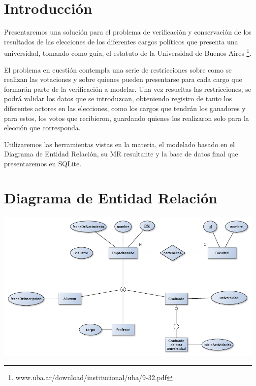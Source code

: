 \documentclass[a4paper, 10pt, twoside]{article}
\begin{document}
\newpage




\section{Introducción}

Presentaremos una solución para el problema de verificación y conservación de los resultados de las elecciones de los diferentes cargos políticos que presenta una universidad, tomando como guía, el estatuto de la Universidad de Buenos Aires \footnote{www.uba.ar/download/institucional/uba/9-32.pdf}.

El problema en cuestión contempla una serie de restricciones sobre como se realizan las votaciones y sobre quienes pueden presentarse para cada cargo que formarán parte de la verificación a modelar. Una vez resueltas las restricciones, se podrá validar los datos que se introduzcan, obteniendo registro de tanto los diferentes actores en las elecciones, como los cargos que tendrán los ganadores y para estos, los votos que recibieron, guardando quienes los realizaron solo para la elección que corresponda.

Utilizaremos las herramientas vistas en la materia, el modelado basado en el Diagrama de Entidad Relación, su MR resultante y la base de datos final que presentaremos en SQLite.


\newpage




\section{Diagrama de Entidad Relación}

\includegraphics{../diagramas/empadronado.pdf}
\end{document}
